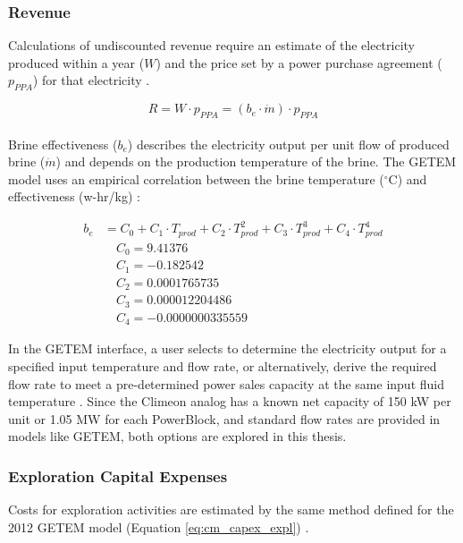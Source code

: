 \subsubsection{Revenue} \label{ch4:cm_rev}

Calculations of undiscounted revenue require an estimate of the electricity produced within a year ($W$) and the price set by a power purchase agreement ($p_{PPA}$) for that electricity \citep{entingh_volume_2006}. 

\begin{equation}
    \label{eq:cm_rev}
    R = W \cdot p_{PPA} = (b_e \cdot \dot{m}) \cdot p_{PPA}
\end{equation}
\\
Brine effectiveness ($b_e$) describes the electricity output per unit flow of produced brine ($\dot{m}$) and depends on the production temperature of the brine. The GETEM model uses an empirical correlation between the brine temperature ($^\circ$C) and effectiveness (w-hr/kg) \citep[p.\ 62]{entingh_volume_2006}:

\begin{equation}
\begin{aligned}
    \label{eq:brine_eff}
    b_e &= C_0 + C_1 \cdot T_{prod} + C_2 \cdot T_{prod}^2 + C_3 \cdot T_{prod}^3 + C_4 \cdot T_{prod}^4 \\
    &\quad C_0 = 9.41376 \\
    &\quad C_1 = -0.182542 \\
    &\quad C_2 = 0.0001765735 \\
    &\quad C_3 = 0.000012204486 \\
    &\quad C_4 = -0.0000000335559
\end{aligned}
\end{equation}

In the GETEM interface, a user selects to determine the electricity output for a specified input temperature and flow rate, or alternatively, derive the required flow rate to meet a pre-determined power sales capacity at the same input fluid temperature \citep{entingh_volume_2006}. Since the Climeon analog has a known net capacity of 150 kW per unit or 1.05 MW for each PowerBlock, and standard flow rates are provided in models like GETEM, both options are explored in this thesis.

\subsubsection{Exploration Capital Expenses} 
\label{ch4:cm_capex_expl}
Costs for exploration activities are estimated by the same method defined for the 2012 GETEM model (Equation \ref{eq:cm_capex_expl}) \citep{eere_getem_2012}. 

